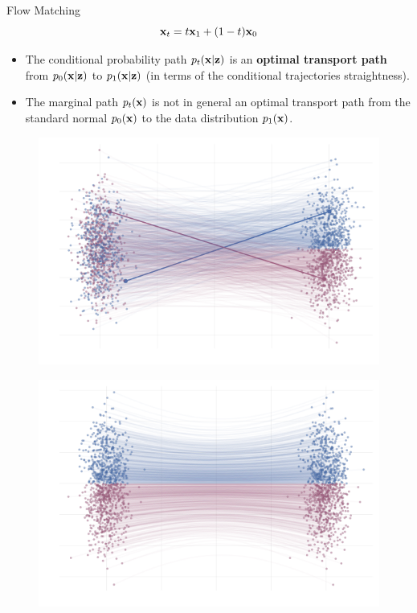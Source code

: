 \begin{frame}{Flow Matching}
	\[
		\mathbf{x}_t = t \mathbf{x}_1 + (1 - t) \mathbf{x}_0
	\]
	\vspace{-0.3cm}
	\begin{itemize}
		\item The conditional probability path $p_t(\mathbf{x}|\mathbf{z})$ is an \textbf{optimal transport path} from $p_0(\mathbf{x}|\mathbf{z})$ to $p_1(\mathbf{x}|\mathbf{z})$ (in terms of the conditional trajectories straightness).
		\item The marginal path $p_t(\mathbf{x})$ is not in general an optimal transport path from the standard normal $p_0(\mathbf{x})$ to the data distribution $p_1(\mathbf{x})$.
	\end{itemize}
	\begin{minipage}[t]{0.5\columnwidth}
			\begin{figure}
				\centering
				\includegraphics[width=\linewidth]{figs/g2g-vector-field-samples-cond}
			\end{figure}
		\end{minipage}%
		\begin{minipage}[t]{0.5\columnwidth}
			\begin{figure}
				\centering
				\includegraphics[width=\linewidth]{figs/g2g-forward_samples}
			\end{figure}
	\end{minipage}
\end{frame}

